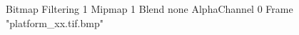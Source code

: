 {Bitmap
	{Filtering 1}
	{Mipmap 1}
	{Blend none}
	{AlphaChannel 0}
	{Frame "platform_xx.tif.bmp"}
}
